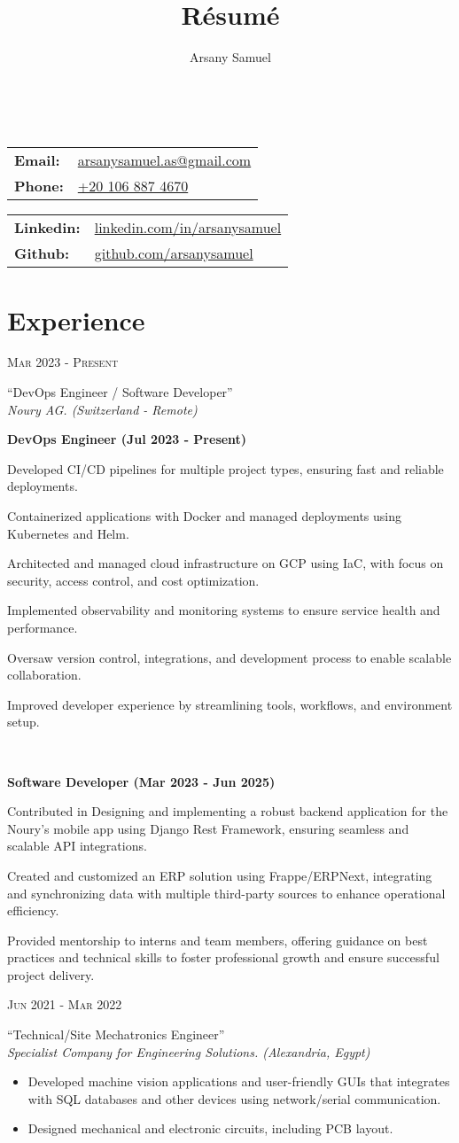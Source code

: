 \documentclass[a4paper]{article}
\title{R\'esum\'e}
\author{Arsany Samuel}
\makeatletter
\renewcommand{\maketitle}{
	\begin{center}
		{\Huge\bfseries{\theauthor}}\\
			\vspace{0.5em}
		{
			\begin{center}
                \begin{minipage}{0.4\linewidth}
                    \large\begin{tabular}{l  l}
                        \textbf{Email:} & \href{mailto:arsanysamuel.as@gmail.com}{arsanysamuel.as@gmail.com}  \\ 
                        \textbf{Phone:} & \href{tel:+201068874670}{+20 106 887 4670}  \\
                    \end{tabular}
                \end{minipage}
                \hspace{1em}
                \begin{minipage}{0.4\linewidth}
                    \large\begin{tabular}{l  l}
                        \textbf{Linkedin:} & \href{https://linkedin.com/in/arsanysamuel}{linkedin.com/in/arsanysamuel}  \\
                        \textbf{Github:} & \href{https://github.com/arsanysamuel}{github.com/arsanysamuel}
                    \end{tabular}
                \end{minipage}
			\end{center}
		}
	\end{center}
}
\newcommand{\entry}[4]{   %
	\begin{center}
		\begin{minipage}[c]{0.2\linewidth}  %
			\vfill
			\hfill  %
			\textsc{#1}  %
			\vfill
		\end{minipage}
		\hfill\vline\hfill  %
		\begin{minipage}[c]{0.75\linewidth}
			\textrm{``#2''} \\
			\textit{#3} \\
			\footnotesize{#4}
		\end{minipage}
	\end{center}
}
\newcommand{\blist}[1]{  %
    \vspace{-\topsep}
    \renewcommand\labelitemi{\tiny$\bullet$}
    \begin{itemize}[leftmargin=3.5mm, noitemsep]
        #1
    \end{itemize}
}
\newcommand{\sitem}[1]{  %
    {\setlength\itemindent{15pt} \item[\textopenbullet] #1}
}
\makeatother
\begin{document}
	\maketitle

	\section{Experience}
        \entry{Mar 2023 - Present}
            {DevOps Engineer / Software Developer}
            {Noury AG. (Switzerland - Remote)}
            {
                \blist{
                    \item \textbf{DevOps Engineer (Jul 2023 - Present)}
                        \sitem{Developed CI/CD pipelines for multiple project types, ensuring fast and reliable deployments.}
                        \sitem{Containerized applications with Docker and managed deployments using Kubernetes and Helm.}
                        \sitem{Architected and managed cloud infrastructure on GCP using IaC, with focus on security, access control, and cost optimization.}
                        \sitem{Implemented observability and monitoring systems to ensure service health and performance.}
                        \sitem{Oversaw version control, integrations, and development process to enable scalable collaboration.}
                        \sitem{Improved developer experience by streamlining tools, workflows, and environment setup.}
                    \\
                    \item \textbf{Software Developer (Mar 2023 - Jun 2025)}
                        \sitem{Contributed in Designing and implementing a robust backend application for the Noury’s mobile app using Django Rest Framework, ensuring seamless and scalable API integrations.}
                        \sitem{Created and customized an ERP solution using Frappe/ERPNext, integrating and synchronizing data with multiple third-party sources to enhance operational efficiency.}
                        \sitem{Provided mentorship to interns and team members, offering guidance on best practices and technical skills to foster professional growth and ensure successful project delivery.}
                }
            }
        \entry{Jun 2021 - Mar 2022}
            {Technical/Site Mechatronics Engineer}
            {Specialist Company for Engineering Solutions. (Alexandria, Egypt)}
            {
                \blist{
                    \item Developed machine vision applications and user-friendly GUIs 
                    that integrates with SQL databases and other devices using network/serial communication.
                    \item Designed mechanical and electronic circuits, including PCB layout.
                }
            }
\end{document}
